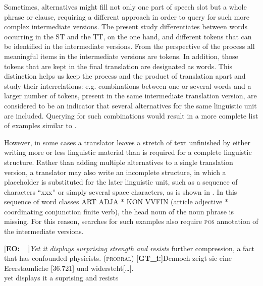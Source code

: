\documentclass[output=paper]{LSP/langsci}
\begin{document}
Sometimes, alternatives might fill not only one part of speech slot but a whole phrase or clause, requiring a different approach in order to query for such more complex intermediate versions. The present study differentiates between words occurring in the ST and the TT, on the one hand, and different tokens that can be identified in the intermediate versions. From the perspective of the process all meaningful items in the intermediate versions are tokens. In addition, those tokens that are kept in the final translation are designated as words. This distinction helps us keep the process and the product of translation apart and study their interrelations: e.g. combinations between one or several words and a larger number of tokens, present in the same intermediate translation version, are considered to be an indicator that several alternatives for the same linguistic unit are included. Querying for such combinations would result in a more complete list of examples similar to .
 
However, in some cases a translator leaves a stretch of text unfinished by either writing more or less linguistic material than is required for a complete linguistic structure. Rather than adding multiple alternatives to a single translation version, a translator may also write an incomplete structure, in which a placeholder is substituted for the later linguistic unit, such as a sequence of characters “xxx” or simply several space characters, as is shown in . In this sequence of word classes ART ADJA * KON VVFIN (article adjective * coordinating conjunction finite verb), the head noun of the noun phrase is missing. For this reason, searches for such examples also require \textsc{pos} annotation of the intermediate versions.



\ea \label{ex:1:5}
\begin{xlist}
\exi{}[\textbf{EO:~~}]{\emph{Yet it displays surprising strength and resists} further compression, a fact that has confounded physicists. (\textsc{probral})}
\exi{}[\textbf{GT\_i:}]{\gll  Denno\stern{}ch\raute\stern\stern\stern\stern\stern{} zeigt\stern\raute{} sie\raute{} eine\raute{} Er\pfeil\pfeil\pfeil\raute{}erstaun\stern\stern{}liche\raute{} [\stern{}36.721] \raute\raute\stern{} und\raute\stern\stern\stern\stern\stern\stern{} widersteht[{\dots}].\\
 yet displays it a suprising\raute{}\raute{}\raute{} {} \raute{}\raute{} and resists \\
}
\end{xlist}
\z
\end{document}
